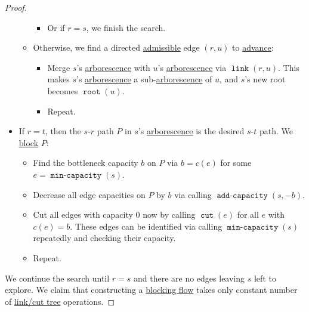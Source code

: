 \begin{proof}
\begin{itemize}
\begin{itemize}
\begin{itemize}
				            \item Or if \(r = s\), we finish the search.
			            \end{itemize}
			      \item Otherwise, we find a directed \hyperref[def:admissible]{admissible} edge \((r, u)\) to \hyperref[algo:general-adaptive-DFS-advance]{advance}:
			            \begin{itemize}
				            \item Merge \(s\)'s \hyperref[def:arborescence]{arborescence} with \(u\)'s \hyperref[def:arborescence]{arborescence} via \(\operatorname{\texttt{link}}(r, u) \). This makes \(s\)'s \hyperref[def:arborescence]{arborescence} a sub-\hyperref[def:arborescence]{arborescence} of \(u\), and \(s\)'s new root becomes \(\operatorname{\texttt{root}}(u) \).
				            \item Repeat.
			            \end{itemize}
		      \end{itemize}
		\item If \(r = t\), then the \(s\)-\(r\) path \(P\) in \(s\)'s \hyperref[def:arborescence]{arborescence} is the desired \(s\)-\(t\) path. We \hyperref[algo:general-adaptive-DFS-block]{block} \(P\):
		      \begin{itemize}
			      \item Find the bottleneck capacity \(b\) on \(P\) via \(b = c(e)\) for some \(e = \operatorname{\texttt{min-capacity}}(s)\).
			      \item Decrease all edge capacities on \(P\) by \(b\) via calling \(\operatorname{\texttt{add-capacity}}(s, -b)\).
			      \item Cut all edges with capacity \(0\) now by calling \(\operatorname{\texttt{cut}} (e)\) for all \(e\) with \(c(e) = b\). These edges can be identified via calling \( \operatorname{\texttt{min-capacity}} (s)\) repeatedly and checking their capacity.
			      \item Repeat.
		      \end{itemize}
	\end{itemize}

	We continue the search until \(r = s\) and there are no edges leaving \(s\) left to explore. We claim that constructing a \hyperref[def:blocking-flow]{blocking flow} takes only constant number of \hyperref[def:link-cut-tree]{link/cut tree} operations.


\end{proof}
